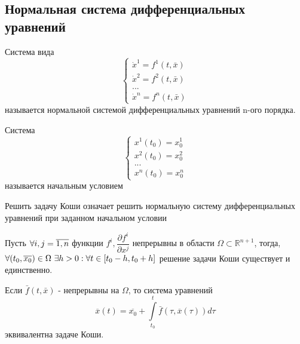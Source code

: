 \subsection{Нормальная система дифференциальных уравнений}

\begin{definition}
	Система вида
	\begin{equation}
		\label{equ:norm-sys}
		\begin{cases*}
			\dot{x}^1 = f^1(t, \bar{x}) \\
			\dot{x}^2 = f^2(t, \bar{x}) \\
			... \\
			\dot{x}^n = f^n(t, \bar{x})
		\end{cases*}
	\end{equation}
	называется нормальной системой дифференциальных уравнений n-ого порядка.
	
\end{definition}

\begin{definition}
	Система
	\begin{equation}
		\label{equ:init-cond}
		\begin{cases*}
			x^1(t_0) = x_0^1 \\
			x^2(t_0) = x_0^2 \\
			... \\
			x^n(t_0) = x_0^n
		\end{cases*}
	\end{equation}
	называется начальным условием
\end{definition}	

\begin{proposition}
	Решить задачу Коши означает решить нормальную систему дифференциальных уравнений при заданном начальном условии
\end{proposition}

\begin{theorem}
	Пусть $\forall i, j \hm= \overline{1, n}$ функции $f^i, \dfrac{\partial{f^i}}{\partial{x^j}}$ непрерывны в области $\Omega \subset \mathbb{R}^{n+1}$, тогда, $\forall (t_0, \overline{x_0}) \in \Omega \text{ } \exists h>0 : \forall t \hm\in [t_0-h, t_0+h]$ решение задачи Коши существует и единственно.
\end{theorem}

\begin{lemma}
	Если $\bar{f}(t, \bar{x})$ - непрерывны на $\Omega$, то система уравнений
	\begin{equation}
		\label{equ:int-sys}
		\overline{x}(t) = \overline{x_0} + \int\limits_{t_0}^t\bar{f}(\tau, \overline{x}(\tau))d\tau
	\end{equation}
	эквивалентна задаче Коши.
\end{lemma}

